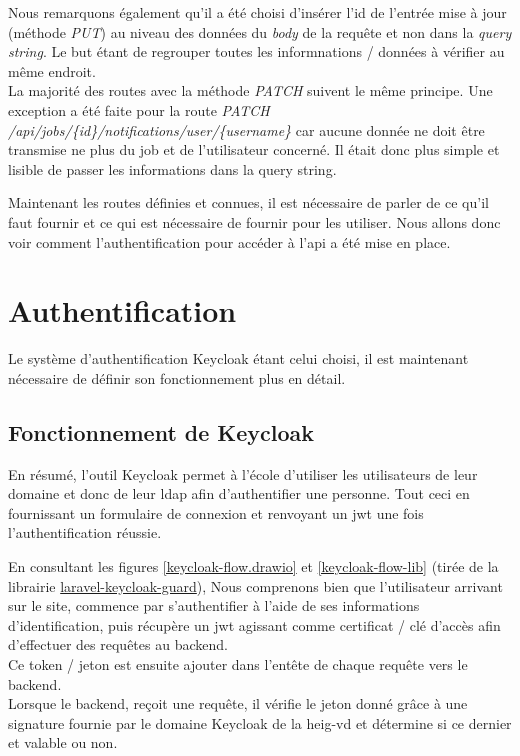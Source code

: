 \documentclass[
    iai, %
    il, %
]{heig-tb}
\begin{document}
Nous remarquons également qu'il a été choisi d'insérer l'id de l'entrée mise à jour (méthode \emph{PUT}) au niveau des données du \emph{body} de la requête et non dans la \emph{query string}. Le but étant de regrouper toutes les informnations / données à vérifier au même endroit. \\
La majorité des routes avec la méthode \emph{PATCH} suivent le même principe. Une exception a été faite pour la route \emph{PATCH /api/jobs/\{id\}/notifications/user/\{username\}} car aucune donnée ne doit être transmise ne plus du job et de l'utilisateur concerné. Il était donc plus simple et lisible de passer les informations dans la query string.

Maintenant les routes définies et connues, il est nécessaire de parler de ce qu'il faut fournir et ce qui est nécessaire de fournir pour les utiliser. Nous allons donc voir comment l'authentification pour accéder à l'\Gls{api} a été mise en place.

\section{Authentification}
Le système d'authentification Keycloak étant celui choisi, il est maintenant nécessaire de définir son fonctionnement plus en détail.

\subsection{Fonctionnement de Keycloak}
En résumé, l'outil Keycloak permet à l'école d'utiliser les utilisateurs de leur domaine et donc de leur \Gls{ldap} afin d'authentifier une personne. Tout ceci en fournissant un formulaire de connexion et renvoyant un \Gls{jwt} une fois l'authentification réussie.

En consultant les figures \ref{keycloak-flow.drawio} et \ref{keycloak-flow-lib} (tirée de la librairie \href{https://github.com/robsontenorio/laravel-keycloak-guard}{laravel-keycloak-guard}), Nous comprenons bien que l'utilisateur arrivant sur le site, commence par s'authentifier à l'aide de ses informations d'identification, puis récupère un \Gls{jwt} agissant comme certificat / clé d'accès afin d'effectuer des requêtes au \Gls{backend}. \\
Ce token / jeton est ensuite ajouter dans l'entête de chaque requête vers le \Gls{backend}. \\
Lorsque le \Gls{backend}, reçoit une requête, il vérifie le jeton donné grâce à une signature fournie par le domaine Keycloak de la \Gls{heig-vd} et détermine si ce dernier et valable ou non.
\end{document}
